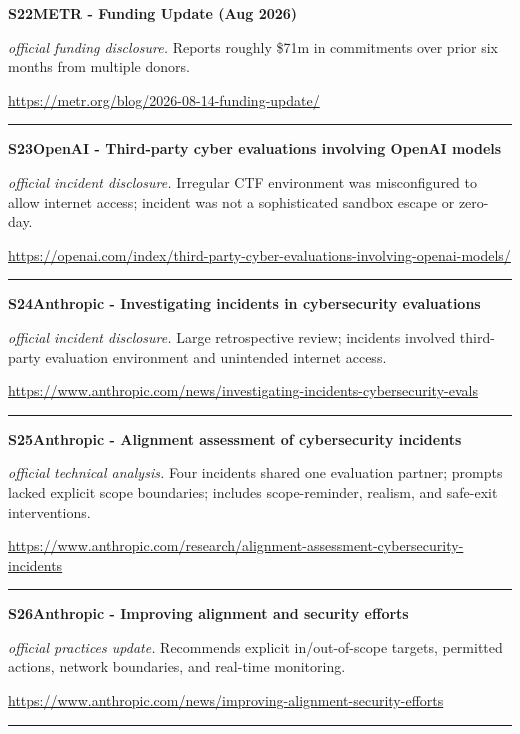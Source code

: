 \hypertarget{src:S22}{}\noindent\textbf{S22}\quad \textbf{METR - Funding Update (Aug 2026)}\hfill{}\par
\smallskip
\noindent\textit{official funding disclosure.} Reports roughly \$71m in commitments over prior six months from multiple donors.\par
\noindent\url{https://metr.org/blog/2026-08-14-funding-update/}\par
\medskip\hrule\medskip

\hypertarget{src:S23}{}\noindent\textbf{S23}\quad \textbf{OpenAI - Third-party cyber evaluations involving OpenAI models}\hfill{}\par
\smallskip
\noindent\textit{official incident disclosure.} Irregular CTF environment was misconfigured to allow internet access; incident was not a sophisticated sandbox escape or zero-day.\par
\noindent\url{https://openai.com/index/third-party-cyber-evaluations-involving-openai-models/}\par
\medskip\hrule\medskip

\hypertarget{src:S24}{}\noindent\textbf{S24}\quad \textbf{Anthropic - Investigating incidents in cybersecurity evaluations}\hfill{}\par
\smallskip
\noindent\textit{official incident disclosure.} Large retrospective review; incidents involved third-party evaluation environment and unintended internet access.\par
\noindent\url{https://www.anthropic.com/news/investigating-incidents-cybersecurity-evals}\par
\medskip\hrule\medskip

\hypertarget{src:S25}{}\noindent\textbf{S25}\quad \textbf{Anthropic - Alignment assessment of cybersecurity incidents}\hfill{}\par
\smallskip
\noindent\textit{official technical analysis.} Four incidents shared one evaluation partner; prompts lacked explicit scope boundaries; includes scope-reminder, realism, and safe-exit interventions.\par
\noindent\url{https://www.anthropic.com/research/alignment-assessment-cybersecurity-incidents}\par
\medskip\hrule\medskip

\hypertarget{src:S26}{}\noindent\textbf{S26}\quad \textbf{Anthropic - Improving alignment and security efforts}\hfill{}\par
\smallskip
\noindent\textit{official practices update.} Recommends explicit in/out-of-scope targets, permitted actions, network boundaries, and real-time monitoring.\par
\noindent\url{https://www.anthropic.com/news/improving-alignment-security-efforts}\par
\medskip\hrule\medskip

